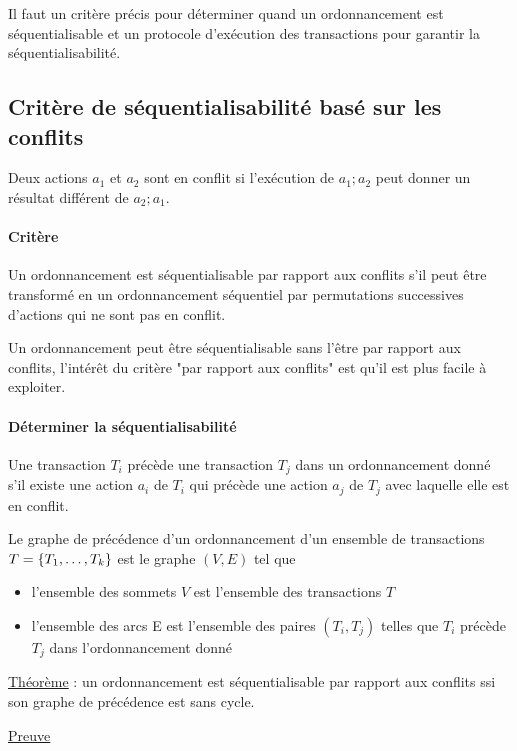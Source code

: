 	Il faut un critère précis pour déterminer quand un ordonnancement est séquentialisable et un protocole d'exécution des transactions pour garantir la séquentialisabilité.


		\subsection{Critère de séquentialisabilité basé sur les conflits}
		
		Deux actions $a_1$ et $a_2$ sont en conflit si l'exécution de $a_1;a_2$ peut donner un résultat différent de $a_2;a_1$.
		
		\paragraph{Critère} Un ordonnancement est séquentialisable par rapport aux conflits s'il peut être transformé en un ordonnancement séquentiel par permutations successives d'actions qui ne sont pas en conflit.
		
		Un ordonnancement peut être séquentialisable sans l'être par rapport aux conflits, l'intérêt du critère "par rapport aux conflits" est qu'il est plus facile à exploiter.
		
		\paragraph{Déterminer la séquentialisabilité} Une transaction $T_i$ précède une transaction $T_j$ dans un ordonnancement donné s'il existe une action $a_i$ de $T_i$ qui précède une action $a_j$ de $T_j$ avec laquelle elle est en conflit.
		
		Le graphe de précédence d'un ordonnancement d'un ensemble de transactions $T = \lbrace T_1, \dots , T_k \rbrace$ est le graphe $(V, E)$ tel que
		
		\begin{itemize}
			\item l'ensemble des sommets $V$ est l'ensemble des transactions $T$
			\item l'ensemble des arcs E est l'ensemble des paires $(T_i, T_j)$ telles que $T_i$ précède $T_j$ dans l'ordonnancement donné
		\end{itemize}
		
		\underline{Théorème} : un ordonnancement est séquentialisable par rapport aux conflits ssi son graphe de précédence est sans cycle.
		
		\underline{Preuve}
		

